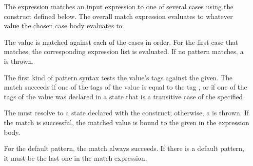 

The  expression matches an input expression to one of
several cases using the  construct defined below.
The overall match expression evaluates to whatever value the
chosen case body evaluates to.

\begin{quote}


 {}  

 {} 


 {}  





 {} 

\end{quote}

The value is matched against each of the cases in order.  For the
first case that matches, the corresponding expression list is
evaluated.  If no pattern matches, a  is
thrown.

The first kind of pattern syntax tests the value's tags against
the  given.  The match succeeds if
one of the tags of the value is equal to the tag
, or if one of the tags of the value
was declared in a state that is a transitive case of the
 specified.

The 
must resolve to a state declared with the  
construct; otherwise, a  is
thrown.  If the
match is successful, the matched value is bound to the
 given in the expression body.

  For the default pattern, the match always succeeds.  If
there is a default pattern, it must be the last one in the match
expression.

